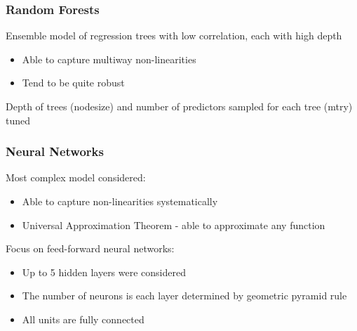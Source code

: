 \documentclass[aspectratio=169]{beamer}
\begin{document}
\begin{frame}
\frametitle{Random Forests}
Ensemble model of regression trees with low correlation, each with high depth
\begin{itemize}
\item Able to capture multiway non-linearities
\item Tend to be quite robust
\end{itemize}
Depth of trees (nodesize) and number of predictors sampled for each tree (mtry) tuned
\end{frame}


\begin{frame}
\frametitle{Neural Networks}
Most complex model considered:
\begin{itemize}
\item Able to capture non-linearities systematically
\item Universal Approximation Theorem - able to approximate any function 
\end{itemize}

Focus on feed-forward neural networks:
\begin{itemize}
\item Up to 5 hidden layers were considered
\item The number of neurons is each layer determined by geometric pyramid rule \citep{masters_practical_1993}
\item All units are fully connected
\end{itemize}
\end{frame}
\end{document}
